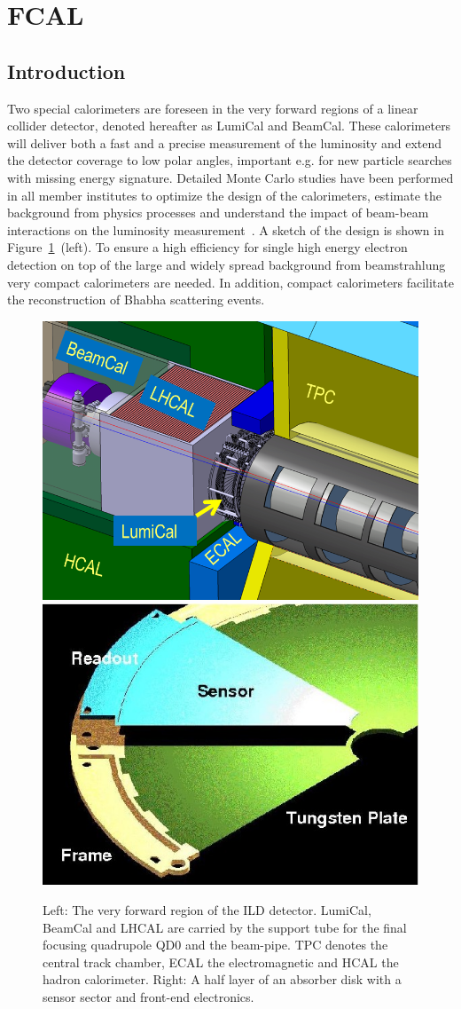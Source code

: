 \section{FCAL}
\subsection{Introduction}
 Two special calorimeters are foreseen in the very forward regions of a linear collider detector, denoted hereafter as
LumiCal and BeamCal.
These calorimeters will deliver both a fast and a precise measurement of the luminosity
and extend the detector coverage to low polar angles,
important e.g. for new particle searches with missing energy signature.
Detailed Monte Carlo studies have been performed in all member institutes to
optimize the design of the calorimeters, estimate the background from physics processes and understand the impact
of beam-beam interactions on the luminosity measurement~\cite{2010JInst...512002A}.
A sketch of the design is shown in Figure~\ref{fig:Forward_structure}~(left).
To ensure a high efficiency for single high energy electron detection on top of the large and widely spread
background from beamstrahlung  very compact calorimeters are needed. In addition, compact calorimeters facilitate
the reconstruction of Bhabha scattering events.
\begin{figure}[hbp]
  \centering
   \includegraphics[width=0.45\columnwidth]{Calorimeter/FCAL/figs/forward_region_new} \hfill
   \includegraphics[width=0.45\columnwidth]{Calorimeter/FCAL/figs/BClayer}
  \caption{Left: The very forward region of the ILD detector.
  LumiCal, BeamCal and LHCAL are carried by
  the support tube for the final focusing quadrupole QD0 and the beam-pipe.
  TPC denotes the central track chamber, ECAL the electromagnetic and
  HCAL the hadron calorimeter.
  Right: A half layer of an absorber disk with a sensor sector and front-end electronics.}
  \label{fig:Forward_structure}
\end{figure}
